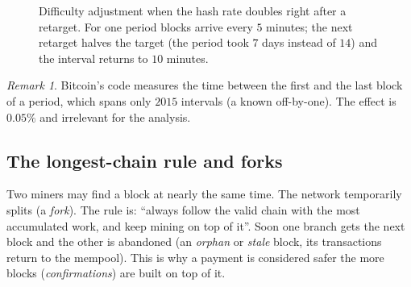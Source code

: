 \documentclass[11pt,a4paper]{article}
\newenvironment{plainenglish}{\par\smallskip}{\par\smallskip}
\theoremstyle{definition}
\theoremstyle{plain}
\theoremstyle{remark}
\newtheorem{remark}[definition]{Remark}
\begin{document}
\begin{figure}[htbp]
\centering
{}
\caption{Difficulty adjustment when the hash rate doubles right after a retarget. For one period blocks arrive every $5$ minutes; the next retarget halves the target (the period took $7$ days instead of $14$) and the interval returns to $10$ minutes.}
\end{figure}

\begin{remark}
Bitcoin's code measures the time between the first and the last block of a period, which spans only $2015$ intervals (a known off-by-one). The effect is $0.05\%$ and irrelevant for the analysis.
\end{remark}

\subsection{The longest-chain rule and forks}

\begin{plainenglish}
Two miners may find a block at nearly the same time. The network temporarily splits (a \emph{fork}). The rule is: ``always follow the valid chain with the most accumulated work, and keep mining on top of it''. Soon one branch gets the next
block and the other is abandoned (an \emph{orphan} or \emph{stale} block, its transactions return to the mempool). This is why a payment is considered safer the more blocks (\emph{confirmations}) are built on top of it.
\end{plainenglish}
\end{document}
